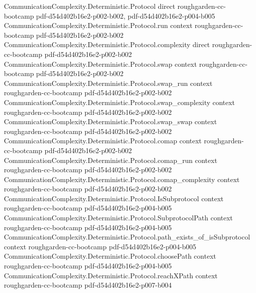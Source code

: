 \begin{theorem}
\label{CommunicationComplexity.Functions.Disjointness.RandomizedLowerBound.fiber_volume_factorization}
\leanok
\proofstep
  {CommunicationComplexity.Deterministic.Protocol}
  {direct}
  {roughgarden-cc-bootcamp}
  {pdf-d54d402b16e2-p002-b002,
    pdf-d54d402b16e2-p004-b005}
\proofstep
  {CommunicationComplexity.Deterministic.Protocol.run}
  {context}
  {roughgarden-cc-bootcamp}
  {pdf-d54d402b16e2-p002-b002}
\proofstep
  {CommunicationComplexity.Deterministic.Protocol.complexity}
  {direct}
  {roughgarden-cc-bootcamp}
  {pdf-d54d402b16e2-p002-b002}
\proofstep
  {CommunicationComplexity.Deterministic.Protocol.swap}
  {context}
  {roughgarden-cc-bootcamp}
  {pdf-d54d402b16e2-p002-b002}
\proofstep
  {CommunicationComplexity.Deterministic.Protocol.swap_run}
  {context}
  {roughgarden-cc-bootcamp}
  {pdf-d54d402b16e2-p002-b002}
\proofstep
  {CommunicationComplexity.Deterministic.Protocol.swap_complexity}
  {context}
  {roughgarden-cc-bootcamp}
  {pdf-d54d402b16e2-p002-b002}
\proofstep
  {CommunicationComplexity.Deterministic.Protocol.swap_swap}
  {context}
  {roughgarden-cc-bootcamp}
  {pdf-d54d402b16e2-p002-b002}
\proofstep
  {CommunicationComplexity.Deterministic.Protocol.comap}
  {context}
  {roughgarden-cc-bootcamp}
  {pdf-d54d402b16e2-p002-b002}
\proofstep
  {CommunicationComplexity.Deterministic.Protocol.comap_run}
  {context}
  {roughgarden-cc-bootcamp}
  {pdf-d54d402b16e2-p002-b002}
\proofstep
  {CommunicationComplexity.Deterministic.Protocol.comap_complexity}
  {context}
  {roughgarden-cc-bootcamp}
  {pdf-d54d402b16e2-p002-b002}
\proofstep
  {CommunicationComplexity.Deterministic.Protocol.IsSubprotocol}
  {context}
  {roughgarden-cc-bootcamp}
  {pdf-d54d402b16e2-p004-b005}
\proofstep
  {CommunicationComplexity.Deterministic.Protocol.SubprotocolPath}
  {context}
  {roughgarden-cc-bootcamp}
  {pdf-d54d402b16e2-p004-b005}
\proofstep
  {CommunicationComplexity.Deterministic.Protocol.path_exists_of_isSubprotocol}
  {context}
  {roughgarden-cc-bootcamp}
  {pdf-d54d402b16e2-p004-b005}
\proofstep
  {CommunicationComplexity.Deterministic.Protocol.choosePath}
  {context}
  {roughgarden-cc-bootcamp}
  {pdf-d54d402b16e2-p004-b005}
\proofstep
  {CommunicationComplexity.Deterministic.Protocol.reachXPath}
  {context}
  {roughgarden-cc-bootcamp}
  {pdf-d54d402b16e2-p007-b004}

\end{theorem}
